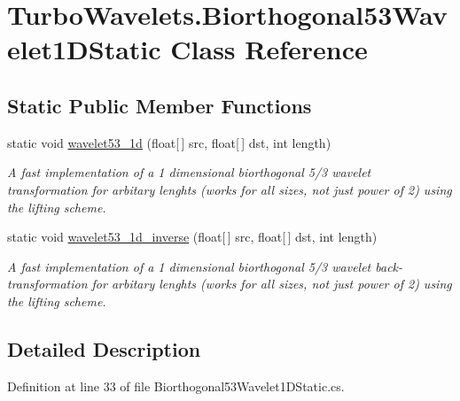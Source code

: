 \hypertarget{class_turbo_wavelets_1_1_biorthogonal53_wavelet1_d_static}{\section{Turbo\+Wavelets.\+Biorthogonal53\+Wavelet1\+D\+Static Class Reference}
\label{class_turbo_wavelets_1_1_biorthogonal53_wavelet1_d_static}
}
\subsection*{Static Public Member Functions}
\begin{DoxyCompactItemize}
\item 
static void \hyperlink{class_turbo_wavelets_1_1_biorthogonal53_wavelet1_d_static_ae7119dd839f9c317e69f7cceadf6da82}{wavelet53\+\_\+1d} (float\mbox{[}$\,$\mbox{]} src, float\mbox{[}$\,$\mbox{]} dst, int length)
\begin{DoxyCompactList}\small\item\em A fast implementation of a 1 dimensional biorthogonal 5/3 wavelet transformation for arbitary lenghts (works for all sizes, not just power of 2) using the lifting scheme. \end{DoxyCompactList}\item 
static void \hyperlink{class_turbo_wavelets_1_1_biorthogonal53_wavelet1_d_static_a9fd288d382428a089990d1e3f6367657}{wavelet53\+\_\+1d\+\_\+inverse} (float\mbox{[}$\,$\mbox{]} src, float\mbox{[}$\,$\mbox{]} dst, int length)
\begin{DoxyCompactList}\small\item\em A fast implementation of a 1 dimensional biorthogonal 5/3 wavelet back-\/transformation for arbitary lenghts (works for all sizes, not just power of 2) using the lifting scheme. \end{DoxyCompactList}\end{DoxyCompactItemize}


\subsection{Detailed Description}


Definition at line 33 of file Biorthogonal53\+Wavelet1\+D\+Static.\+cs.



